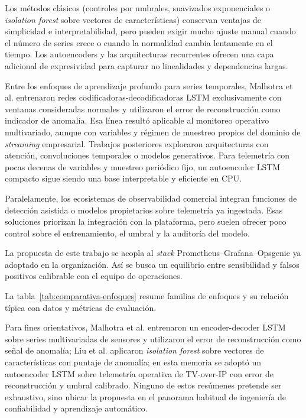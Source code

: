 Los métodos clásicos (controles por umbrales, suavizados exponenciales o \textit{isolation forest} \citep{liu2008isolation} sobre vectores de características) conservan ventajas de simplicidad e interpretabilidad, pero pueden exigir mucho ajuste manual cuando el número de series crece o cuando la normalidad cambia lentamente en el tiempo. Los autoencoders y las arquitecturas recurrentes ofrecen una capa adicional de expresividad para capturar no linealidades y dependencias largas.

Entre los enfoques de aprendizaje profundo para series temporales, Malhotra et al. \citep{malhotra2015long} entrenaron redes codificadoras-decodificadoras LSTM exclusivamente con ventanas consideradas normales y utilizaron el error de reconstrucción como indicador de anomalía. Esa línea resultó aplicable al monitoreo operativo multivariado, aunque con variables y régimen de muestreo propios del dominio de \textit{streaming} empresarial. Trabajos posteriores exploraron arquitecturas con atención, convoluciones temporales o modelos generativos. Para telemetría con pocas decenas de variables y muestreo periódico fijo, un autoencoder LSTM compacto sigue siendo una base interpretable y eficiente en CPU.

Paralelamente, los ecosistemas de observabilidad comercial integran funciones de detección asistida o modelos propietarios sobre telemetría ya ingestada. Esas soluciones priorizan la integración con la plataforma, pero suelen ofrecer poco control sobre el entrenamiento, el umbral y la auditoría del modelo. 

La propuesta de este trabajo se acopla al \textit{stack} Prometheus--Grafana--Opsgenie \citep{salituro2020grafana, grafana_site, opsgenie_site} ya adoptado en la organización. Así se busca un equilibrio entre sensibilidad y falsos positivos calibrable con el equipo de operaciones.

La tabla~\ref{tab:comparativa-enfoques} resume familias de enfoques y su relación típica con datos y métricas de evaluación. 

Para fines orientativos, Malhotra et al. \citep{malhotra2015long} entrenaron un encoder-decoder LSTM sobre series multivariadas de sensores y utilizaron el error de reconstrucción como señal de anomalía; Liu et al. \citep{liu2008isolation} aplicaron \textit{isolation forest} sobre vectores de características con puntaje de anomalía; en esta memoria se adoptó un autoencoder LSTM sobre telemetría operativa de TV-over-IP con error de reconstrucción y umbral calibrado. Ninguno de estos resúmenes pretende ser exhaustivo, sino ubicar la propuesta en el panorama habitual de ingeniería de confiabilidad y aprendizaje automático.

